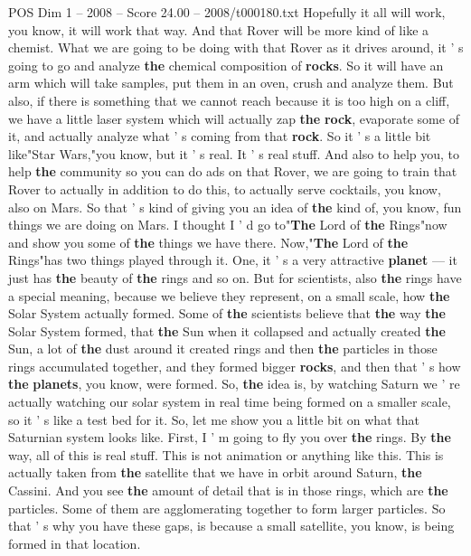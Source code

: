 \begin{textsample}{POS Dim 1 – 2008 – Score 24.00 – 2008/t000180.txt}
Hopefully it all will work, you know, it will work that way.
And that Rover will be more kind of like a chemist.
What we are going to be doing with that Rover as it drives around, it ' s going to go and analyze \textbf{the} chemical composition of \textbf{rocks}.
So it will have an arm which will take samples, put them in an oven, crush and analyze them.
But also, if there is something that we cannot reach because it is too high on a cliff, we have a little laser system which will actually zap \textbf{the} \textbf{rock}, evaporate some of it, and actually analyze what ' s coming from that \textbf{rock}.
So it ' s a little bit like"Star Wars,"you know, but it ' s real.
It ' s real stuff.
And also to help you, to help \textbf{the} community so you can do ads on that Rover, we are going to train that Rover to actually in addition to do this, to actually serve cocktails, you know, also on Mars.
So that ' s kind of giving you an idea of \textbf{the} kind of, you know, fun things we are doing on Mars.
I thought I ' d go to"\textbf{The} Lord of \textbf{the} Rings"now and show you some of \textbf{the} things we have there.
Now,"\textbf{The} Lord of \textbf{the} Rings"has two things played through it.
One, it ' s a very attractive \textbf{planet} — it just has \textbf{the} beauty of \textbf{the} rings and so on.
But for scientists, also \textbf{the} rings have a special meaning, because we believe they represent, on a small scale, how \textbf{the} Solar System actually formed.
Some of \textbf{the} scientists believe that \textbf{the} way \textbf{the} Solar System formed, that \textbf{the} Sun when it collapsed and actually created \textbf{the} Sun, a lot of \textbf{the} dust around it created rings and then \textbf{the} particles in those rings accumulated together, and they formed bigger \textbf{rocks}, and then that ' s how \textbf{the} \textbf{planets}, you know, were formed.
So, \textbf{the} idea is, by watching Saturn we ' re actually watching our solar system in real time being formed on a smaller scale, so it ' s like a test bed for it.
So, let me show you a little bit on what that Saturnian system looks like.
First, I ' m going to fly you over \textbf{the} rings.
By \textbf{the} way, all of this is real stuff.
This is not animation or anything like this.
This is actually taken from \textbf{the} satellite that we have in orbit around Saturn, \textbf{the} Cassini.
And you see \textbf{the} amount of detail that is in those rings, which are \textbf{the} particles.
Some of them are agglomerating together to form larger particles.
So that ' s why you have these gaps, is because a small satellite, you know, is being formed in that location.

\end{textsample}
